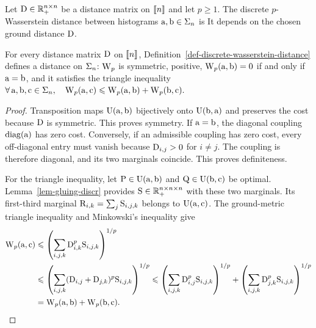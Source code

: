 \begin{defn}\label{def-discrete-wasserstein-distance}
Let $\mathrm{D}\in\mathbb{R}_+^{n\times n}$ be a distance matrix on $\llbracket n\rrbracket$ and let $p\geq1$. The discrete $p$-Wasserstein distance between histograms $\mathrm{a},\mathrm{b}\in\Sigma_n$ is
It depends on the chosen ground distance $\mathrm{D}$.
\end{defn}
\begin{prop}\label{prop-metric-histo}
For every distance matrix $\mathrm{D}$ on $\llbracket n\rrbracket$, Definition~\ref{def-discrete-wasserstein-distance} defines a distance on $\Sigma_n$: $\operatorname{\mathrm{W}}_p$ is symmetric, positive, $\operatorname{\mathrm{W}}_p(\mathrm{a},\mathrm{b})=0$ if and only if $\mathrm{a} = \mathrm{b}$, and it satisfies the triangle inequality
\(\forall \, \mathrm{a},\mathrm{b},\mathrm{c} \in \Sigma_n, \quad \operatorname{\mathrm{W}}_p(\mathrm{a},\mathrm{c}) \leqslant \operatorname{\mathrm{W}}_p(\mathrm{a},\mathrm{b}) + \operatorname{\mathrm{W}}_p(\mathrm{b},\mathrm{c}).\)
\end{prop}
\begin{proof}
Transposition maps $\mathrm{U}(\mathrm{a},\mathrm{b})$ bijectively onto $\mathrm{U}(\mathrm{b},\mathrm{a})$ and preserves the cost because $\mathrm{D}$ is symmetric. This proves symmetry. If $\mathrm{a}=\mathrm{b}$, the diagonal coupling $\operatorname{diag}(\mathrm{a})$ has zero cost. Conversely, if an admissible coupling has zero cost, every off-diagonal entry must vanish because $\mathrm{D}_{i,j}>0$ for $i\neq j$. The coupling is therefore diagonal, and its two marginals coincide. This proves definiteness.

For the triangle inequality, let $\mathrm{P}\in\mathrm{U}(\mathrm{a},\mathrm{b})$ and $\mathrm{Q}\in\mathrm{U}(\mathrm{b},\mathrm{c})$ be optimal. Lemma~\ref{lem-gluing-discr} provides $\mathrm{S}\in\mathbb{R}_+^{n\times n\times n}$ with these two marginals. Its first-third marginal
\(\mathrm{R}_{i,k}=\sum_j\mathrm{S}_{i,j,k}\)
belongs to $\mathrm{U}(\mathrm{a},\mathrm{c})$. The ground-metric triangle inequality and Minkowski's inequality give
\[
\begin{aligned}
\operatorname{\mathrm{W}}_p(\mathrm{a},\mathrm{c})
&\leqslant \left(\sum_{i,j,k}\mathrm{D}_{i,k}^p\mathrm{S}_{i,j,k}\right)^{1/p}\\
&\leqslant \left(\sum_{i,j,k}(\mathrm{D}_{i,j}+\mathrm{D}_{j,k})^p\mathrm{S}_{i,j,k}\right)^{1/p}
\leqslant \left(\sum_{i,j,k}\mathrm{D}_{i,j}^p\mathrm{S}_{i,j,k}\right)^{1/p}
+\left(\sum_{i,j,k}\mathrm{D}_{j,k}^p\mathrm{S}_{i,j,k}\right)^{1/p}\\
&=\operatorname{\mathrm{W}}_p(\mathrm{a},\mathrm{b})+\operatorname{\mathrm{W}}_p(\mathrm{b},\mathrm{c}).
\end{aligned}
\]
\end{proof}
